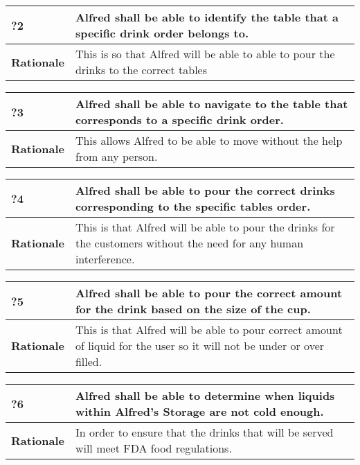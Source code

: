\documentclass [11pt]{article}
\begin{document}
\begin{longtable}{| p{ } | p{ } | }\hline 
\rowcolor{tableCell}\textbf{?2} & Alfred shall be able to identify the table that a specific drink order belongs to.\\ \hline
\textbf{Rationale} &  This is so that Alfred will be able to able to pour the drinks to the correct tables\\ \hline 

\end{longtable}

\begin{longtable}{| p{ } | p{ } | }\hline 
\rowcolor{tableCell}\textbf{?3} &  Alfred shall be able to navigate to the table that corresponds to a specific drink order. \\ \hline
\textbf{Rationale} & This allows Alfred to be able to move without the help from any person. \\ \hline 
\end{longtable}

\begin{longtable}{| p{ } | p{ } | }\hline 
\rowcolor{tableCell}\textbf{?4} & Alfred shall be able to pour the correct drinks corresponding to the specific tables order.\\ \hline
\textbf{Rationale} &  This is that Alfred will be able to pour the drinks for the customers without the need for any human interference. \\ \hline 
\end{longtable}

\begin{longtable}{| p{ } | p{ } | }\hline 
	\rowcolor{tableCell}\textbf{?5} & Alfred shall be able to pour the correct amount for the drink based on the size of the cup.\\ \hline
	\textbf{Rationale} &  This is that Alfred will be able to pour correct amount of liquid for the user so it will not be under or over filled. \\ \hline 
\end{longtable}

\begin{longtable}{| p{ } | p{ } | }\hline 
	\rowcolor{tableCell}\textbf{?6} & Alfred shall be able to determine when liquids within Alfred's Storage are not cold enough.\\ \hline
	\textbf{Rationale} &  In order to ensure that the drinks that will be served will meet FDA food regulations. \\ \hline 
\end{longtable}
\end{document}
